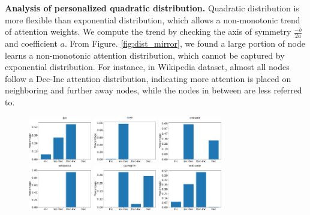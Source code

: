 \documentclass{article}
\begin{document}
\textbf{Analysis of personalized quadratic distribution.}
Quadratic distribution is more flexible than exponential distribution, which allows a non-monotonic trend of attention weights. We compute the trend by checking the axis of symmetry $\frac{-b}{2a}$ and coefficient $a$. 
From Figure. \ref{fig:dist_mirror}, we found a large portion of node learns a non-monotonic attention distribution, which cannot be captured by exponential distribution. For instance, in Wikipedia dataset, almost all nodes follow a Dec-Inc attention distribution, indicating more attention is placed on neighboring and further away nodes, while the nodes in between are less referred to.

\begin{figure}
    \centering
    \includegraphics[width=0.245\textwidth]{cs699/fig/ppi_quad.pdf}
    \includegraphics[width=0.245\textwidth]{cs699/fig/cora_quad.pdf}
    \includegraphics[width=0.245\textwidth]{cs699/fig/citeseer_quad.pdf}\\
    \includegraphics[width=0.245\textwidth]{cs699/fig/wikipedia_quad.pdf}
    \includegraphics[width=0.245\textwidth]{cs699/fig/ca-HepTh_quad.pdf}
    \includegraphics[width=0.245\textwidth]{cs699/fig/wiki-vote_quad.pdf}

\end{figure}
\end{document}

